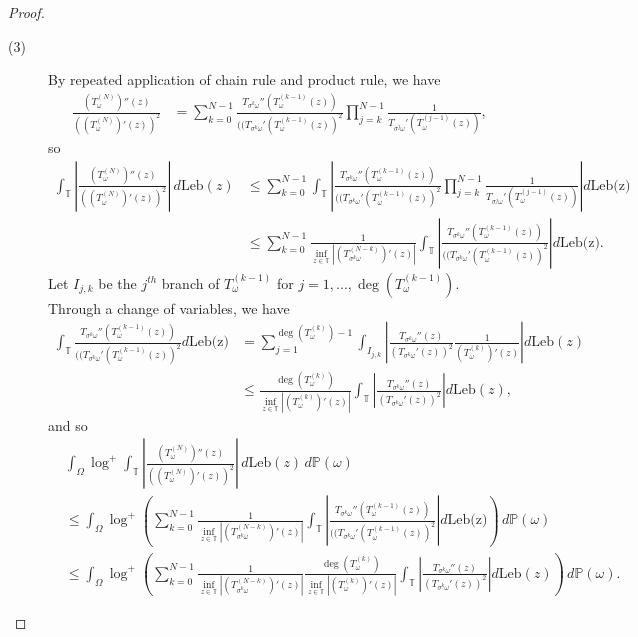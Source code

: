 \documentclass[10pt,a4paper]{amsart}
\begin{document}
\begin{proof}
\begin{description}
    \item[(3)] By repeated application of chain rule and product rule, we have \begin{align*}
        \frac{(T_{\omega}^{(N)})''(z)}{((T_{\omega}^{(N)})'(z))^2}&=\sum_{k=0}^{N-1}\frac{T_{\sigma^{k}\omega}''(T_{\omega}^{(k-1)}(z))}{((T_{\sigma^{k}\omega}'(T_{\omega}^{(k-1)}(z))^2}\prod_{j=k}^{N-1}\frac{1}{T_{\sigma^{j}\omega}'(T_{\omega}^{(j-1)}(z))},
    \end{align*} so \begin{align*}
        \int_{\mathbb{T}}\left|\frac{(T_{\omega}^{(N)})''(z)}{((T_{\omega}^{(N)})'(z))^2}\right|\,d\text{Leb}(z)&\le\sum_{k=0}^{N-1}\int_{\mathbb{T}}\left|\frac{T_{\sigma^{k}\omega}''(T_{\omega}^{(k-1)}(z))}{((T_{\sigma^{k}\omega}'(T_{\omega}^{(k-1)}(z))^2}\prod_{j=k}^{N-1}\frac{1}{T_{\sigma^{j}\omega}'(T_{\omega}^{(j-1)}(z))}\right|d\text{Leb(z)}\\&\le\sum_{k=0}^{N-1}\frac{1}{\inf_{z\in\mathbb{T}}|(T_{\sigma^{k}\omega}^{(N-k)})'(z)|}\int_{\mathbb{T}}\left|\frac{T_{\sigma^{k}\omega}''(T_{\omega}^{(k-1)}(z))}{((T_{\sigma^{k}\omega}'(T_{\omega}^{(k-1)}(z))^2}\right|d\text{Leb(z)}.
    \end{align*} Let $I_{j,k}$ be the $j^{th}$ branch of $T_{\omega}^{(k-1)}$ for $j=1,...,\deg(T_{\omega}^{(k-1)}).$ Through a change of variables, we have \begin{align*} \int_{\mathbb{T}}\frac{T_{\sigma^{k}\omega}''(T_{\omega}^{(k-1)}(z))}{((T_{\sigma^{k}\omega}'(T_{\omega}^{(k-1)}(z))^2}d\text{Leb(z)}&=\sum_{j=1}^{\deg(T_{\omega}^{(k)})-1}\int_{I_{j,k}}\left|\frac{T_{\sigma^{k}\omega}''(z)}{(T_{\sigma^{k}\omega}'(z))^2}\frac{1}{(T_{\omega}^{(k)})'(z)}\right|d\text{Leb}(z)\\&\le\frac{\deg(T_{\omega}^{(k)})}{\inf_{z\in\mathbb{T}}|(T_{\omega}^{(k)})'(z)|}\int_{\mathbb{T}}\left|\frac{T_{\sigma^{k}\omega}''(z)}{(T_{\sigma^{k}\omega}'(z))^2}\right|d\text{Leb}(z),
    \end{align*} and so \begin{align*}
        &\int_{\Omega}\log^{+}\int_{\mathbb{T}}\left|\frac{(T_{\omega}^{(N)})''(z)}{((T_{\omega}^{(N)})'(z))^2}\right|\,d\text{Leb}(z)\,d\mathbb{P}(\omega)\\&\le\int_{\Omega}\log^{+}\left(\sum_{k=0}^{N-1}\frac{1}{\inf_{z\in\mathbb{T}}|(T_{\sigma^{k}\omega}^{(N-k)})'(z)|}\int_{\mathbb{T}}\left|\frac{T_{\sigma^{k}\omega}''(T_{\omega}^{(k-1)}(z))}{((T_{\sigma^{k}\omega}'(T_{\omega}^{(k-1)}(z))^2}\right|d\text{Leb(z)}\right)\,d\mathbb{P}(\omega)\\&\le \int_{\Omega}\log^{+}\left(\sum_{k=0}^{N-1}\frac{1}{\inf_{z\in\mathbb{T}}|(T_{\sigma^{k}\omega}^{(N-k)})'(z)|}\frac{\deg(T_{\omega}^{(k)})}{\inf_{z\in\mathbb{T}}|(T_{\omega}^{(k)})'(z)|}\int_{\mathbb{T}}\left|\frac{T_{\sigma^{k}\omega}''(z)}{(T_{\sigma^{k}\omega}'(z))^2}\right|d\text{Leb}(z)\right)\,d\mathbb{P}(\omega).\end{align*} 
        

\end{description}
\end{proof}
\end{document}
